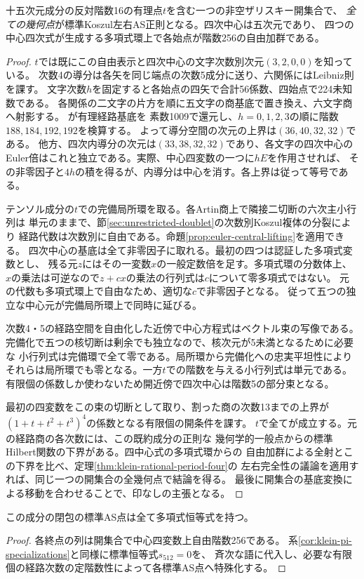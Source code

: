 \begin{theorem}\label{thm:full-component-central-open}
十五次元成分の反対階数16の有理点$t$を含む一つの非空ザリスキー開集合で、
\emph{全ての幾何点}が標準Koszul左右AS正則となる。四次中心は五次元であり、
四つの中心四次式が生成する多項式環上で各始点が階数256の自由加群である。
\end{theorem}
\begin{proof}
$t$では既にこの自由表示と四次中心の文字次数別次元$(3,2,0,0)$を知っている。
次数4の導分は各矢を同じ端点の次数5成分に送り、六関係にはLeibniz則を課す。
文字次数$h$を固定すると各始点の四矢で合計56係数、四始点で224未知数である。
各関係の二文字の片方を順に五文字の商基底で置き換え、六文字商へ射影する。
が有理経路基底を
素数1009で還元し、$h=0,1,2,3$の順に階数$188,184,192,192$を検算する。
よって導分空間の次元の上界は$(36,40,32,32)$である。
他方、四次内導分の次元は$(33,38,32,32)$であり、各文字の四次中心の
Euler倍はこれと独立である。実際、中心四変数の一つに$hE$を作用させれば、
その非零因子と$4h$の積を得るが、内導分は中心を消す。各上界は従って等号である。

テンソル成分の$t$での完備局所環を取る。各Artin商上で隣接二切断の六次主小行列は
単元のままで、節\ref{sec:unrestricted-doublet}の次数別Koszul複体の分裂により
経路代数は次数別に自由である。命題\ref{prop:euler-central-lifting}を適用できる。
四次中心の基底は全て非零因子に取れる。最初の四つは認証した多項式変数とし、
残る元$z$にはその一変数$x$の一般定数倍を足す。多項式環の分数体上、
$x$の乗法は可逆なので$z+c x$の乗法の行列式は$c$について零多項式ではない。
元の代数も多項式環上で自由なため、適切な$c$で非零因子となる。
従って五つの独立な中心元が完備局所環上で同時に延びる。

次数4・5の経路空間を自由化した近傍で中心方程式はベクトル束の写像である。
完備化で五つの核切断は剰余でも独立なので、核次元が5未満となるために必要な
小行列式は完備環で全て零である。局所環から完備化への忠実平坦性により
それらは局所環でも零となる。一方$t$での階数を与える小行列式は単元である。
有限個の係数しか使わないため開近傍で四次中心は階数5の部分束となる。

最初の四変数をこの束の切断として取り、割った商の次数13までの上界が
$(1+t+t^2+t^3)^4$の係数となる有限個の開条件を課す。
$t$で全てが成立する。元の経路商の各次数には、この既約成分の正則な
幾何学的一般点からの標準Hilbert関数の下界がある。四中心式の多項式環からの
自由加群による全射とこの下界を比べ、定理\ref{thm:klein-rational-period-four}の
左右完全性の議論を適用すれば、同じ一つの開集合の全幾何点で結論を得る。
最後に開集合の基底変換による移動を合わせることで、印なしの主張となる。
\end{proof}

\begin{corollary}
この成分の閉包の標準AS点は全て多項式恒等式を持つ。
\end{corollary}
\begin{proof}
各終点の列は開集合で中心四変数上自由階数256である。
系\ref{cor:klein-pi-specializations}と同様に標準恒等式$s_{512}=0$を、
斉次な語に代入し、必要な有限個の経路次数の定階数性によって各標準AS点へ特殊化する。
\end{proof}
